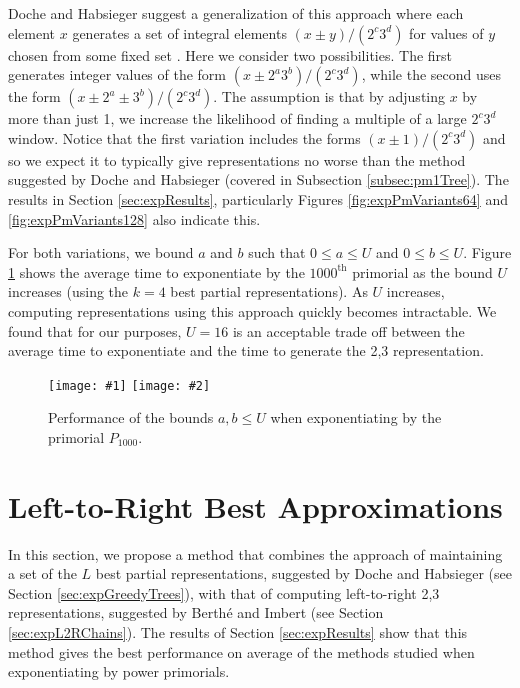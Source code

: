 \documentclass{ucalgthes1}
\theoremstyle{definition}
\newcommand{\mygraphTwoX}[5]{
	\begin{figure}[htb]
	\centering
	\texttt{[image: \#1]}
	\texttt{[image: \#2]}
	\caption[#5]{#4}
	\label{#3}
	\end{figure}
}
\begin{document}
Doche and Habsieger suggest a generalization of this approach where each element $x$ generates a set of integral elements $(x \pm y)/(2^c3^d)$ for values of $y$ chosen from some fixed set \cite[\S 5]{Doche2008}.  Here we consider two possibilities.  The first generates integer values of the form $(x \pm 2^a3^b)/(2^c3^d)$, while the second uses the form $(x \pm 2^a \pm 3^b) / (2^c 3^d)$.  The assumption is that by adjusting $x$ by more than just 1, we increase the likelihood of finding a multiple of a large $2^c3^d$ window.  Notice that the first variation includes the forms $(x \pm 1)/(2^c 3^d)$ and so we expect it to typically give representations no worse than the method suggested by Doche and Habsieger \cite{Doche2008} (covered in Subsection \ref{subsec:pm1Tree}).  The results in Section \ref{sec:expResults}, particularly Figures \ref{fig:expPmVariants64} and \ref{fig:expPmVariants128} also indicate this.

For both variations, we bound $a$ and $b$ such that $0 \le a \le U$ and $0 \le b \le U$.  Figure \ref{fig:pm2a3bVaryMax} shows the average time to exponentiate by the $1000^{\textrm{th}}$ primorial as the bound $U$ increases (using the $k=4$ best partial representations).  As $U$ increases, computing representations using this approach quickly becomes intractable.  We found that for our purposes, $U=16$ is an acceptable trade off between the average time to exponentiate and the time to generate the 2,3 representation.

\mygraphTwoX{pm2a3b_vary_max-64}{pm2a3b_vary_max-128}{fig:pm2a3bVaryMax}{Performance of the bounds $a, b \le U$ when exponentiating by the primorial $P_{1000}$.}{Global Bounds on Pruned Trees.}

\clearpage


\section{Left-to-Right Best Approximations}
\label{sec:expBestApproximations}

In this section, we propose a method that combines the approach of maintaining a set of the $L$ best partial representations, suggested by Doche and Habsieger \cite{Doche2008} (see Section \ref{sec:expGreedyTrees}), with that of computing left-to-right 2,3 representations, suggested by Berth{\'e} and Imbert \cite{Berthe2009} (see Section \ref{sec:expL2RChains}).  The results of Section \ref{sec:expResults} show that this method gives the best performance on average of the methods studied when exponentiating by power primorials.
\end{document}
